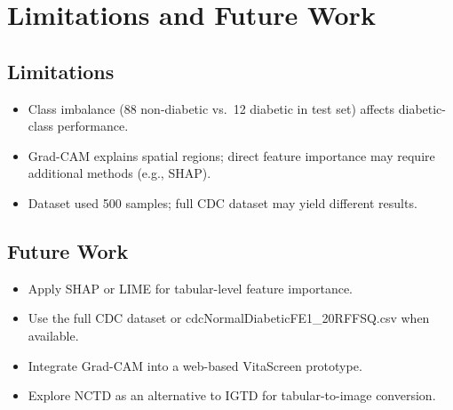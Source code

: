 \documentclass[12pt]{dalthesis}
\begin{document}
\chapter{Limitations and Future Work}
\section{Limitations}

\begin{itemize}
\item Class imbalance (88 non-diabetic vs.\ 12 diabetic in test set) affects diabetic-class performance.
\item Grad-CAM explains spatial regions; direct feature importance may require additional methods (e.g., SHAP).
\item Dataset used 500 samples; full CDC dataset may yield different results.
\end{itemize}

\section{Future Work}

\begin{itemize}
\item Apply SHAP or LIME for tabular-level feature importance.
\item Use the full CDC dataset or cdcNormalDiabeticFE1\_20RFFSQ.csv when available.
\item Integrate Grad-CAM into a web-based VitaScreen prototype.
\item Explore NCTD as an alternative to IGTD for tabular-to-image conversion.
\end{itemize}



\end{document}
